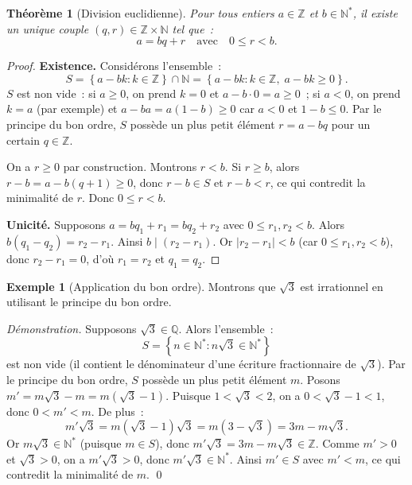 \documentclass[12pt,a4paper,openany]{book}
\theoremstyle{definition}
\newtheorem{exemple}[definition]{Exemple}
\theoremstyle{plain}
\newtheorem{theoreme}[definition]{Théorème}
\theoremstyle{remark}
\newcommand{\N}{\mathbb{N}}
\newcommand{\Z}{\mathbb{Z}}
\newcommand{\Q}{\mathbb{Q}}
\newcommand{\abs}[1]{\left|#1\right|}
\newcommand{\set}[1]{\left\{#1\right\}}
\begin{document}
\begin{theoreme}[Division euclidienne]\label{thm:div-euclidienne}
  Pour tous entiers $a \in \Z$ et $b \in \N^*$, il existe un unique couple $(q,r) \in \Z \times \N$ tel que~:
  \[
    a = bq + r \quad \text{avec} \quad 0 \leq r < b.
  \]
\end{theoreme}

\begin{proof}
  \textbf{Existence.} Consid\'erons l'ensemble~:
  \[
    S = \set{a - bk : k \in \Z} \cap \N = \set{a - bk : k \in \Z, \; a - bk \geq 0}.
  \]
  $S$ est non vide~: si $a \geq 0$, on prend $k = 0$ et $a - b \cdot 0 = a \geq 0$~; si $a < 0$, on prend $k = a$ (par exemple) et $a - ba = a(1 - b) \geq 0$ car $a < 0$ et $1 - b \leq 0$. Par le principe du bon ordre, $S$ poss\`ede un plus petit \'el\'ement $r = a - bq$ pour un certain $q \in \Z$.

  On a $r \geq 0$ par construction. Montrons $r < b$. Si $r \geq b$, alors $r - b = a - b(q+1) \geq 0$, donc $r - b \in S$ et $r - b < r$, ce qui contredit la minimalit\'e de $r$. Donc $0 \leq r < b$.

  \textbf{Unicit\'e.} Supposons $a = bq_1 + r_1 = bq_2 + r_2$ avec $0 \leq r_1, r_2 < b$. Alors $b(q_1 - q_2) = r_2 - r_1$. Ainsi $b \mid (r_2 - r_1)$. Or $\abs{r_2 - r_1} < b$ (car $0 \leq r_1, r_2 < b$), donc $r_2 - r_1 = 0$, d'o\`u $r_1 = r_2$ et $q_1 = q_2$.
\end{proof}

\begin{exemple}[Application du bon ordre]\label{ex:bon-ordre}
  Montrons que $\sqrt{3}$ est irrationnel en utilisant le principe du bon ordre.

  \smallskip
  \noindent\textit{D\'emonstration.} Supposons $\sqrt{3} \in \Q$. Alors l'ensemble~:
  \[
    S = \set{n \in \N^* : n\sqrt{3} \in \N^*}
  \]
  est non vide (il contient le d\'enominateur d'une \'ecriture fractionnaire de $\sqrt{3}$). Par le principe du bon ordre, $S$ poss\`ede un plus petit \'el\'ement $m$. Posons $m' = m\sqrt{3} - m = m(\sqrt{3} - 1)$. Puisque $1 < \sqrt{3} < 2$, on a $0 < \sqrt{3} - 1 < 1$, donc $0 < m' < m$. De plus~:
  \[
    m' \sqrt{3} = m(\sqrt{3} - 1)\sqrt{3} = m(3 - \sqrt{3}) = 3m - m\sqrt{3}.
  \]
  Or $m\sqrt{3} \in \N^*$ (puisque $m \in S$), donc $m'\sqrt{3} = 3m - m\sqrt{3} \in \Z$. Comme $m' > 0$ et $\sqrt{3} > 0$, on a $m'\sqrt{3} > 0$, donc $m'\sqrt{3} \in \N^*$. Ainsi $m' \in S$ avec $m' < m$, ce qui contredit la minimalit\'e de $m$. \qed
\end{exemple}
\end{document}
